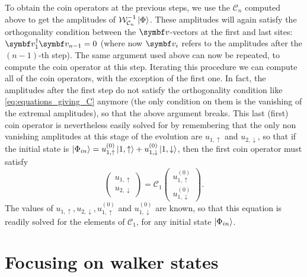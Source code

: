 To obtain the coin operators at the previous steps, we use the $\mathcal C_n$ computed above to get the amplitudes of $\mathcal W_{\mathcal C_n}^{-1} \ket\Phi$.
These amplitudes will again satisfy the orthogonality condition between the $\bs v$-vectors at the first and last sites:
${\bs v_1^\dagger \bs v_{n-1} = 0}$
(where now $\bs v_i$ refers to the amplitudes after the $(n-1)$-th step).
The same argument used above can now be repeated, to compute the coin operator at this step.
Iterating this procedure we can compute all of the coin operators, with the exception of the first one.
In fact, the amplitudes after the first step do not satisfy the orthogonality condition like \cref{eq:equations_giving_C} anymore (the only condition on them is the vanishing of the extremal amplitudes), so that the above argument breaks.
This last (first) coin operator is nevertheless easily solved for by remembering that the only non vanishing amplitudes at this stage of the evolution are $u_{1,\uparrow}$ and $u_{2, \downarrow}$, so that if the initial state is
${\ket{\Phi_{in}} = u^{(0)}_{1,\uparrow} \ket{1, \uparrow} + u^{(0)}_{1, \downarrow} \ket{1, \downarrow}}$, then the first coin operator must satisfy
\begin{equation}
	\begin{pmatrix}
		u_{1, \uparrow} \\ u_{2,\downarrow}
	\end{pmatrix}
	= \mathcal C_1
	\begin{pmatrix}
		u^{(0)}_{1, \uparrow} \\ u^{(0)}_{1, \downarrow}
	\end{pmatrix}.
\end{equation}
The values of $u_{1, \uparrow}, u_{2,\downarrow}, u^{(0)}_{1, \uparrow}$ and $u^{(0)}_{1, \downarrow}$ are known, so that this equation is readily solved for the elements of $\mathcal C_1$, for any initial state $\ket{\Phi_{in}}$.

\section{Focusing on walker states}
\label{sec:focusing_walker_states}

